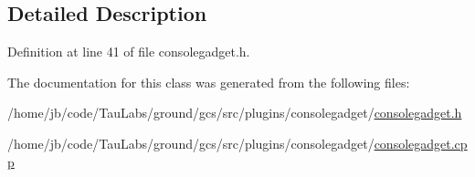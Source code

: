 \subsection{\-Detailed \-Description}


\-Definition at line 41 of file consolegadget.\-h.



\-The documentation for this class was generated from the following files\-:\begin{DoxyCompactItemize}
\item 
/home/jb/code/\-Tau\-Labs/ground/gcs/src/plugins/consolegadget/\hyperlink{consolegadget_8h}{consolegadget.\-h}\item 
/home/jb/code/\-Tau\-Labs/ground/gcs/src/plugins/consolegadget/\hyperlink{consolegadget_8cpp}{consolegadget.\-cpp}\end{DoxyCompactItemize}
